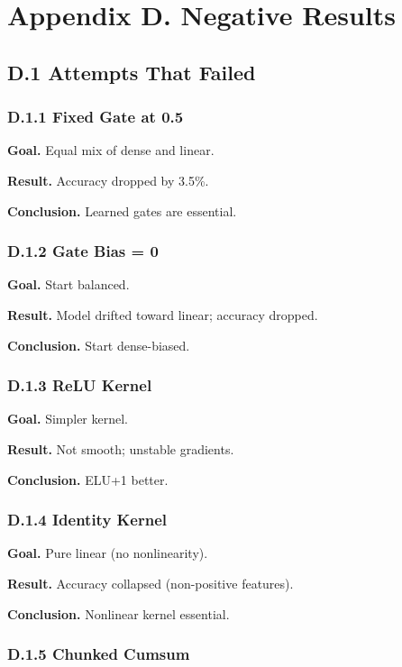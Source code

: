 
\section{Appendix D. Negative Results}

\subsection{D.1 Attempts That Failed}

\subsubsection{D.1.1 Fixed Gate at 0.5}

\textbf{Goal.} Equal mix of dense and linear.

\textbf{Result.} Accuracy dropped by 3.5\%.

\textbf{Conclusion.} Learned gates are essential.

\subsubsection{D.1.2 Gate Bias = 0}

\textbf{Goal.} Start balanced.

\textbf{Result.} Model drifted toward linear; accuracy dropped.

\textbf{Conclusion.} Start dense-biased.

\subsubsection{D.1.3 ReLU Kernel}

\textbf{Goal.} Simpler kernel.

\textbf{Result.} Not smooth; unstable gradients.

\textbf{Conclusion.} ELU+1 better.

\subsubsection{D.1.4 Identity Kernel}

\textbf{Goal.} Pure linear (no nonlinearity).

\textbf{Result.} Accuracy collapsed (non-positive features).

\textbf{Conclusion.} Nonlinear kernel essential.

\subsubsection{D.1.5 Chunked Cumsum}

